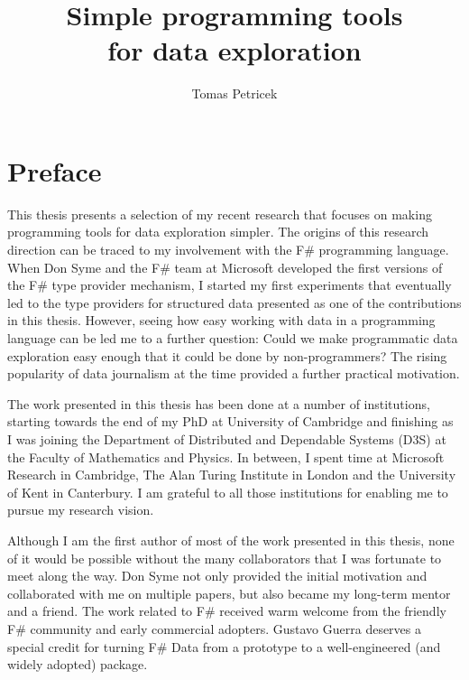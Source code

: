 \documentclass[fleqn,11pt]{report}
\theoremstyle{definition}
\begin{document}
\title{\Huge\textbf{Simple programming tools \\for data exploration}}
\author{Tomas Petricek}
\maketitle

\chapter*{Preface}
\label{ch:preface}

This thesis presents a selection of my recent research that focuses on making programming
tools for data exploration simpler. The origins of this research direction can be traced to
my involvement with the F\# programming language. When Don Syme and the F\# team at Microsoft
developed the first versions of the F\# type provider mechanism, I started my first experiments
that eventually led to the type providers for structured data presented as one of the contributions
in this thesis. However, seeing how easy working with data in a programming language can be
led me to a further question: Could we make programmatic data exploration easy enough that it
could be done by non-programmers? The rising popularity of data journalism at the time provided
a further practical motivation.

The work presented in this thesis has been done at a number of institutions, starting towards the
end of my PhD at University of Cambridge and finishing as I was joining the Department of
Distributed and Dependable Systems (D3S) at the Faculty of Mathematics and Physics. In between,
I spent time at Microsoft Research in Cambridge, The Alan Turing Institute in London and the
University of Kent in Canterbury. I am grateful to all those institutions for enabling me to
pursue my research vision.

Although I am the first author of most of the work presented in this thesis, none of it would be
possible without the many collaborators that I was fortunate to meet along the way. Don Syme
not only provided the initial motivation and collaborated with me on multiple papers, but also
became my long-term mentor and a friend. The work related to F\# received warm welcome from the
friendly F\# community and early commercial adopters. Gustavo Guerra deserves a special credit
for turning F\# Data from a prototype to a well-engineered (and widely adopted) package.
\end{document}
